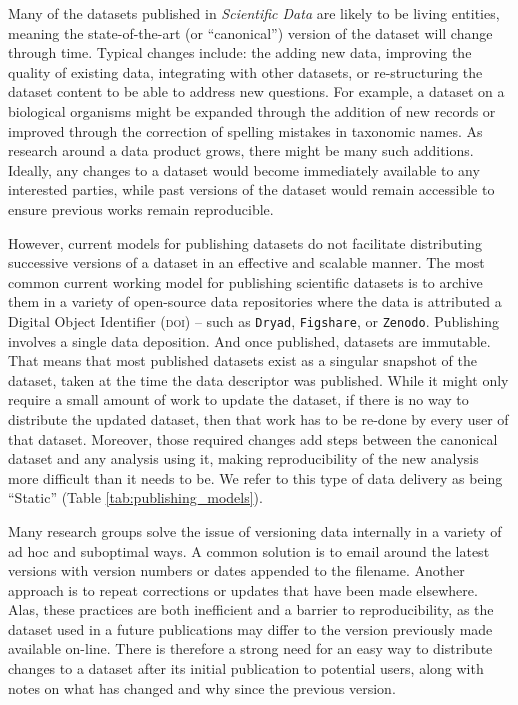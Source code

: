 \documentclass[a4paper,11pt]{article}
\begin{document}
Many of the datasets published in \emph{Scientific Data} are likely to be living entities, meaning the state-of-the-art (or ``canonical'') version of the dataset will change through time. Typical changes include: the adding new data, improving the quality of existing data, integrating with other datasets, or re-structuring the dataset content to be able to address new questions. For example, a dataset on a biological organisms might be expanded through the addition of new records or improved through the correction of spelling mistakes in taxonomic names. As research around a data product grows, there might be many such additions. Ideally, any changes to a dataset would become immediately available to any interested parties, while past versions of the dataset would remain accessible to ensure previous works remain reproducible.

However, current models for publishing datasets do not facilitate distributing successive versions of a dataset in an effective and scalable manner. The most common current working model for publishing scientific datasets is to archive them in a variety of open-source data repositories where the data is attributed a Digital Object Identifier (\textsc{doi}) -- such as \texttt{Dryad}, \texttt{Figshare}, or \texttt{Zenodo}. Publishing involves a single data deposition. And once published, datasets are immutable. That means that most published datasets exist as a singular snapshot of the dataset, taken at the time the data descriptor was published. While it might only require a small amount of work to update the dataset, if there is no way to distribute the updated dataset, then that work has to be re-done by every user of that dataset. Moreover, those required changes add steps between the canonical dataset and any analysis using it, making reproducibility of the new analysis more difficult than it needs to be. We refer to this type of data delivery as being ``Static'' (Table \ref{tab:publishing_models}).

Many research groups solve the issue of versioning data internally in a variety of ad hoc and suboptimal ways. A common solution is to email around the latest versions with version numbers or dates appended to the filename. Another approach is to repeat corrections or updates that have been made elsewhere. Alas, these practices are both inefficient and a barrier to reproducibility, as the dataset used in a future publications may differ to the version previously made available on-line. There is therefore a strong need for an easy way to distribute changes to a dataset after its initial publication to potential users, along with notes on what has changed and why since the previous version.
\end{document}
